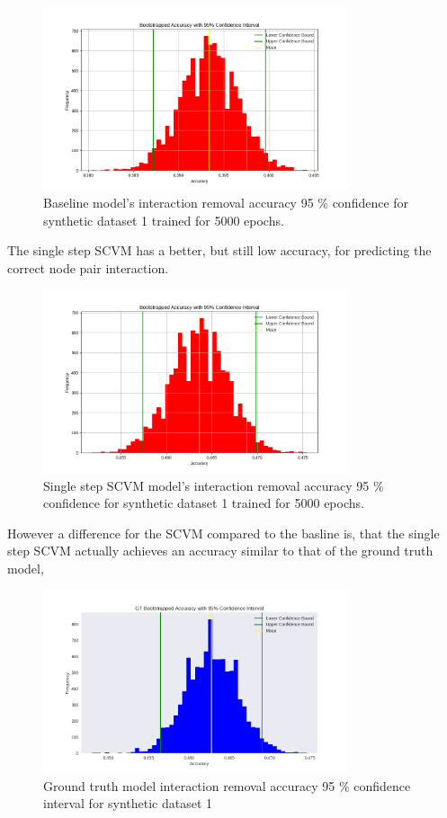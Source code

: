 \begin{figure}[H]
    \centering
    \includegraphics[width=0.8\textwidth]{0_images/rq1_baseline_accuracy.png}
    \caption{Baseline model's interaction removal accuracy 95 \% confidence for synthetic dataset 1 trained for 5000 epochs.}
    \label{fig:RQ1:baseline_accuracy}
\end{figure}
\noindent 
The single step SCVM has a better, but still low accuracy, for predicting the correct node pair interaction.
\begin{figure}[H]
    \centering
    \includegraphics[width=0.8\textwidth]{0_images/rq1_SCVM_accuracy.png}
    \caption{Single step SCVM model's interaction removal accuracy 95 \% confidence for synthetic dataset 1 trained for 5000 epochs.}
    \label{fig:RQ1:SCVM_accuracy}
\end{figure}
\noindent
However a difference for the SCVM compared to the basline is, that the single step SCVM actually achieves an accuracy similar to that of the ground truth model,
\begin{figure}[H]
    \centering
    \includegraphics[width=0.8\textwidth]{0_images/rq1_GT_accuracy_SCVM.png}
    \caption{Ground truth model interaction removal accuracy 95 \% confidence interval for synthetic dataset 1}
\end{figure}
